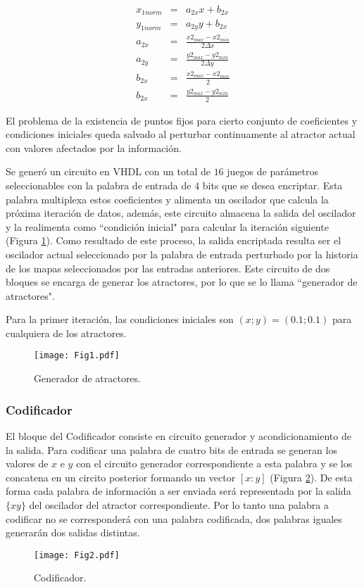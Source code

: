 %
\begin{eqnarray}\label{eq:norm_entrada}
x_{1norm}&=& a_{2x} x+b_{2x} \nonumber\\
y_{1norm}&=& a_{2y} y+b_{2x} \nonumber\\
a_{2x}&=& \frac{x2_{max}-x2_{min}}{2\Delta x} \nonumber\\
a_{2y}&=& \frac{y2_{max}-y2_{min}}{2\Delta y} \nonumber\\
b_{2x}&=& \frac{x2_{max}-x2_{min}}{2} \nonumber\\
b_{2x}&=& \frac{y2_{max}-y2_{min}}{2}
\end{eqnarray}

El problema de la existencia de puntos fijos para cierto conjunto de coeficientes y condiciones iniciales queda salvado al perturbar continuamente al atractor actual con valores afectados por la información.

Se generó un circuito en VHDL con un total de $16$ juegos de parámetros seleccionables con la palabra de entrada de $4$ bits que se desea encriptar.
Esta palabra multiplexa estos coeficientes y alimenta un oscilador que calcula la próxima iteración de datos, además, este circuito almacena la salida del oscilador y la realimenta como ``condición inicial" para calcular la iteración siguiente (Figura \ref{fig:generador}).
Como resultado de este proceso, la salida encriptada resulta ser el oscilador actual seleccionado por la palabra de entrada perturbado por la historia de los mapas seleccionados por las entradas anteriores.
Este circuito de dos bloques se encarga de generar los atractores, por lo que se lo llama ``generador de atractores".

Para la primer iteración, las condiciones iniciales son $(x;y)=(0.1;0.1)$ para cualquiera de los atractores.
%
\begin{figure}
    \centering
    \texttt{[image: Fig1.pdf]}\\
    \caption{Generador de atractores.}\label{fig:generador}
\end{figure}

\subsubsection{Codificador}
El bloque del Codificador consiste en circuito generador y acondicionamiento de la salida.
Para codificar una palabra de cuatro bits de entrada se generan los valores de $x$ e $y$ con el circuito generador correspondiente a esta palabra y se los concatena en un circito posterior formando un vector $[x:y]$ (Figura \ref{fig:codificador}).
De esta forma cada palabra de información a ser enviada será representada por la salida $\{xy\}$ del oscilador del atractor correspondiente.
Por lo tanto una palabra a codificar no se corresponderá con una palabra codificada, dos palabras iguales generarán dos salidas distintas.
%
\begin{figure}
    \centering
    \texttt{[image: Fig2.pdf]}\\
    \caption{Codificador.}\label{fig:codificador}
\end{figure}

